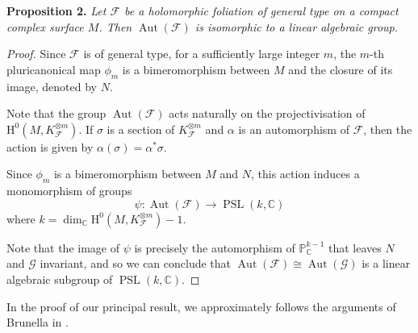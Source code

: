 \documentclass[british]{article}
\newenvironment{itenv}[1]
  {\phantomsection\par\smallskip\noindent\textbf{#1.}\itshape}
  {\par\smallskip}
\newcommand{\oldpage}[1]{\marginpar{\footnotesize$\Big\vert$ \textit{p.~#1}}}
\begin{document}
\protect{}\label{proposition-2}
\begin{itenv}{Proposition 2}
Let \({\mathcal{F}}\) be a holomorphic foliation of general type on a
compact complex surface \(M\). Then
\(\operatorname{Aut}({\mathcal{F}})\) is isomorphic to a linear
algebraic group.

\end{itenv}

\begin{proof}
Since \({\mathcal{F}}\) is of general type, for a sufficiently large
integer \(m\), the \(m\)-th pluricanonical map \(\phi_m\) is a
bimeromorphism between \(M\) and the closure of its image, denoted by
\(N\).

Note that the group \(\operatorname{Aut}({\mathcal{F}})\) acts naturally
on the projectivisation of
\(\mathrm{H}^0(M,K_{\mathcal{F}}^{\otimes m})\). If \(\sigma\) is a
section of \(K_{\mathcal{F}}^{\otimes m}\) and \(\alpha\) is an
automorphism of \({\mathcal{F}}\), then the action is given by
\(\alpha(\sigma)=\alpha^*\sigma\).

Since \(\phi_m\) is a bimeromorphism between \(M\) and \(N\), this
action induces a monomorphism of groups \[
  \psi\colon \operatorname{Aut}({\mathcal{F}}) \to \operatorname{PSL}(k,\mathbb{C})
\] where
\(k=\dim_\mathbb{C}\mathrm{H}^0(M,K_{\mathcal{F}}^{\otimes m})-1\).

\oldpage{56}

Note that the image of \(\psi\) is precisely the automorphism of
\(\mathbb{P}_\mathbb{C}^{k-1}\) that leaves \(N\) and \({\mathcal{G}}\)
invariant, and so we can conclude that
\(\operatorname{Aut}({\mathcal{F}})\cong\operatorname{Aut}({\mathcal{G}})\)
is a linear algebraic subgroup of \(\operatorname{PSL}(k,\mathbb{C})\).
\end{proof}

In the proof of our principal result, we approximately follows the
arguments of Brunella in \autocite[86--88]{2}.
\end{document}
